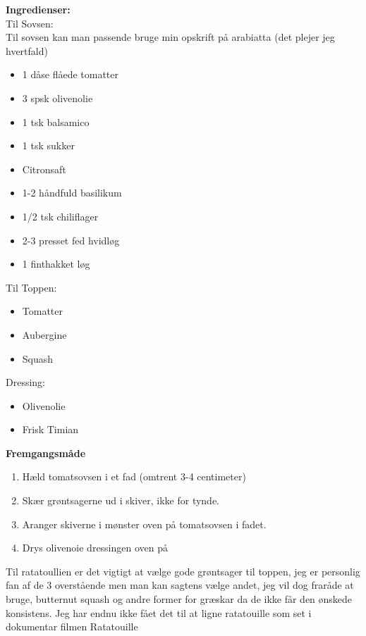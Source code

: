 \documentclass{book}
\begin{document}
\begin{minipage}[t]{0.5\textwidth}
\textbf{Ingredienser:}
\\ Til Sovsen:
\\ Til sovsen kan man passende bruge min opskrift på arabiatta (det plejer jeg hvertfald)
\begin{itemize}
    \item 1 dåse flåede tomatter
    \item 3 spsk olivenolie
    \item 1 tsk balsamico
    \item 1 tsk sukker
    \item Citronsaft
    \item 1-2 håndfuld basilikum
    \item 1/2 tsk chiliflager 
    \item 2-3 presset fed hvidløg
    \item 1 finthakket løg
\end{itemize}
Til Toppen:
\begin{itemize}
    \item Tomatter
    \item Aubergine
    \item Squash 
\end{itemize}
Dressing:
\begin{itemize}
    \item Olivenolie
    \item Frisk Timian
\end{itemize}
\end{minipage}
\begin{minipage}[t]{0.5\textwidth}
\textbf{Fremgangsmåde}
    \begin{enumerate}
        \item Hæld tomatsovsen i et fad (omtrent 3-4 centimeter)
        \item Skær grøntsagerne ud i skiver, ikke for tynde.
        \item Aranger skiverne i mønster oven på tomatsovsen i fadet.
        \item Drys olivenoie dressingen oven på
   \end{enumerate}

\end{minipage}
Til ratatoullien er det vigtigt at vælge gode grøntsager til toppen, jeg er personlig fan af de 3 overstående men man kan sagtens vælge andet, jeg vil dog fraråde at bruge, butternut squash og andre former for græskar da de ikke får den ønskede konsistens. Jeg har endnu ikke fået det til at ligne ratatouille som set i dokumentar filmen Ratatouille 
\end{document}
